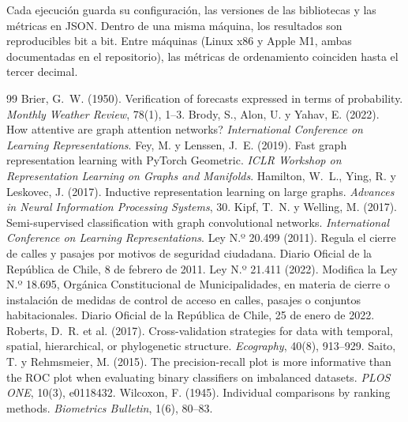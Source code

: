 \documentclass[11pt,a4paper]{article}
\begin{document}
Cada ejecución guarda su configuración, las versiones de las bibliotecas y las métricas en JSON.
Dentro de una misma máquina, los resultados son reproducibles bit a bit. Entre máquinas (Linux x86
y Apple M1, ambas documentadas en el repositorio), las métricas de ordenamiento coinciden hasta el
tercer decimal.

\begin{thebibliography}{99}
 Brier, G.~W. (1950). Verification of forecasts expressed in terms of
  probability. \emph{Monthly Weather Review}, 78(1), 1--3.
 Brody, S., Alon, U. y Yahav, E. (2022). How attentive are graph attention
  networks? \emph{International Conference on Learning Representations}.
 Fey, M. y Lenssen, J.~E. (2019). Fast graph representation learning with
  PyTorch Geometric. \emph{ICLR Workshop on Representation Learning on Graphs and Manifolds}.
 Hamilton, W.~L., Ying, R. y Leskovec, J. (2017). Inductive representation
  learning on large graphs. \emph{Advances in Neural Information Processing Systems}, 30.
 Kipf, T.~N. y Welling, M. (2017). Semi-supervised classification with graph
  convolutional networks. \emph{International Conference on Learning Representations}.
 Ley N.º 20.499 (2011). Regula el cierre de calles y pasajes por motivos de
  seguridad ciudadana. Diario Oficial de la República de Chile, 8 de febrero de 2011.
 Ley N.º 21.411 (2022). Modifica la Ley N.º 18.695, Orgánica Constitucional de
  Municipalidades, en materia de cierre o instalación de medidas de control de acceso en calles,
  pasajes o conjuntos habitacionales. Diario Oficial de la República de Chile, 25 de enero de 2022.
 Roberts, D.~R. et al. (2017). Cross-validation strategies for data with
  temporal, spatial, hierarchical, or phylogenetic structure. \emph{Ecography}, 40(8), 913--929.
 Saito, T. y Rehmsmeier, M. (2015). The precision-recall plot is more
  informative than the ROC plot when evaluating binary classifiers on imbalanced datasets.
  \emph{PLOS ONE}, 10(3), e0118432.
 Wilcoxon, F. (1945). Individual comparisons by ranking methods.
  \emph{Biometrics Bulletin}, 1(6), 80--83.
\end{thebibliography}
\end{document}
